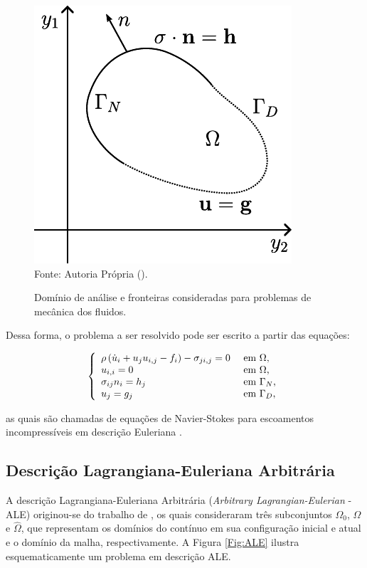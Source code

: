 \documentclass[_ArquivoPrincipal.tex]{subfiles}
\begin{document}
\begin{figure}[h]
    \centering
    \caption{Domínio de análise e fronteiras consideradas para problemas de mecânica dos fluidos.}
    \includegraphics[width=.35\linewidth]{Figuras/Dom}
    \\Fonte: Autoria Própria (\the\year).
    \label{fig:Dom}
\end{figure}

Dessa forma, o problema a ser resolvido pode ser escrito a partir das equações:

\begin{equation}
    \left\{
    \begin{array}{ll}
        \rho\left({\dot{u}_i+u_ju_{i,j}-f_i}\right)-\sigma_{ji,j}=0 & \text{ em }\Omega\text{,}   \\
        u_{i,i}=0                                             & \text{ em }\Omega\text{,}   \\
        \sigma_{ij}n_i=h_j                                    & \text{ em }\Gamma_N\text{,} \\
        u_j=g_j                                               & \text{ em }\Gamma_D\text{,}
    \end{array}
    \right.\label{eq:NS-Euler}
\end{equation}

\noindent as quais são chamadas de equações de Navier-Stokes para escoamentos incompressíveis em descrição Euleriana \cite{bazilevs2013computational,bazilevs2010large,bazilevs2007variational,hughes2002variational,hughes2000large}.

\subsection{Descrição Lagrangiana-Euleriana Arbitrária} \label{CFD-ALE}

A descrição Lagrangiana-Euleriana Arbitrária (\textit{Arbitrary Lagrangian-Eulerian} - ALE) originou-se do trabalho de , os quais consideraram três subconjuntos $\Omega_0$, $\Omega$ e $\hat{\Omega}$, que representam os domínios do contínuo em sua configuração inicial e atual e o domínio da malha, respectivamente. A Figura \ref{Fig:ALE} ilustra esquematicamente um problema em descrição ALE.
\end{document}
